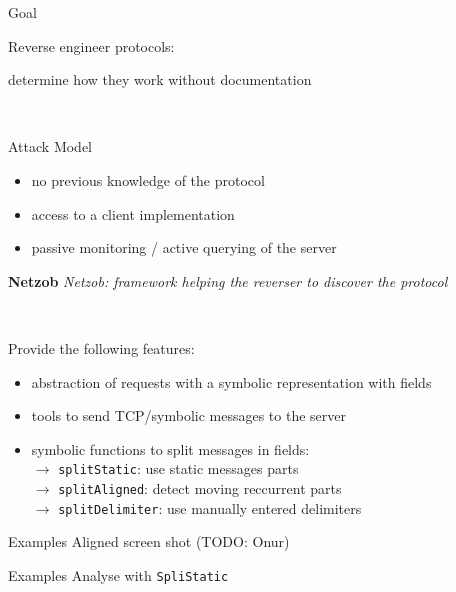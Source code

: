 \documentclass{beamer}
\newcounter{m} %
\newcounter{c} %
\begin{document}
\begin{frame}{Goal}

  Reverse engineer protocols:

  determine how they work without documentation

  ~

  \begin{block}{Attack Model}
    \begin{itemize}
      \item no previous knowledge of the protocol
      \item access to a client implementation
      \item passive monitoring / active querying of the server
    \end{itemize}
  \end{block}

\end{frame}

\begin{frame}{\textbf{Netzob}}
  \em{Netzob}: framework helping the reverser to discover the protocol
 
  ~

  Provide the following features:

  \begin{itemize}
    \item abstraction of requests with a symbolic representation with fields
    \item tools to send TCP/symbolic messages to the server
    \item symbolic functions to split messages in fields:\\
    \quad\quad$\rightarrow$ \texttt{splitStatic}: use static messages parts\\
    \quad\quad$\rightarrow$ \texttt{splitAligned}: detect moving reccurrent parts\\
    \quad\quad$\rightarrow$ \texttt{splitDelimiter}: use manually entered delimiters
  \end{itemize}


\end{frame}


\begin{frame}{Examples}
  Aligned screen shot (TODO: Onur)
\end{frame}

\begin{frame}{Examples}
  Analyse with \texttt{SpliStatic}

  ~

  \tiny
\end{frame}
\end{document}
